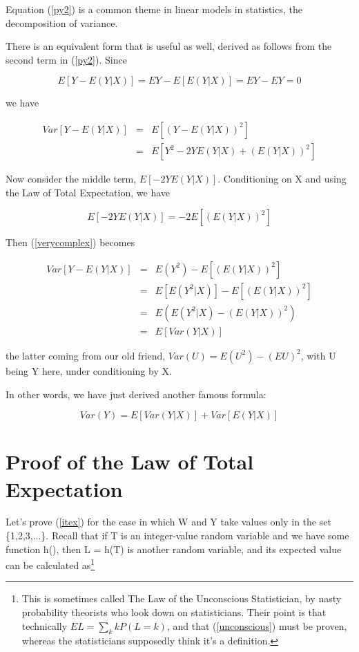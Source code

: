 Equation (\ref{py2}) is a common theme in linear models in statistics,
the decomposition of variance.  

There is an equivalent form that is useful as well, derived as follows
from the second term in (\ref{py2}).  Since

\begin{equation}
E[Y-E(Y|X)] = EY - E[E(Y|X)] = EY - EY = 0
\end{equation}

we have

\begin{eqnarray}
\label{verycomplex}
Var[Y-E(Y|X)] &=& E \left [ (Y-E(Y|X))^2 \right ] \\ 
&=& E \left [ Y^2 -2YE(Y|X) + (E(Y|X))^2 \right ] 
\end{eqnarray}

Now consider the middle term, $E[-2YE(Y|X)]$.  Conditioning on X and
using the Law of Total Expectation, we have

\begin{equation}
E[-2YE(Y|X)] = -2 E \left [ (E(Y|X))^2 \right ]
\end{equation}

Then (\ref{verycomplex}) becomes

\begin{eqnarray}
Var[Y-E(Y|X)] &=& E (Y^2) - E \left [ (E(Y|X))^2 \right ] \\
&=& E \left [ E(Y^2 | X) \right ] - E \left [ (E(Y|X))^2 \right ] \\
&=& E \left ( E(Y^2 | X) - (E(Y|X))^2 \right ) \\
&=& E \left [ Var(Y|X) \right ]
\end{eqnarray}

the latter coming from our old friend, $Var(U) = E(U^2) - (EU)^2$, with
U being Y here, under conditioning by X.

In other words, we have just derived another famous formula:

\begin{equation}
Var(Y) = E[Var(Y|X)] + Var[E(Y|X)]
\end{equation}

\section{Proof of the Law of Total Expectation}
\label{proveitex} 

Let's prove (\ref{itex}) for the case in which W and Y take values only
in the set \{1,2,3,...\}.  Recall that if T is an integer-value random
variable and we have some function h(), then L = h(T) is another random
variable, and its expected value can be calculated as\footnote{This is
sometimes called The Law of the Unconscious Statistician, by nasty
probability theorists who look down on statisticians.  Their point is
that technically $EL = \sum_k k P(L = k)$, and that (\ref{unconscious})
must be proven, whereas the statisticians supposedly think it's a
definition.}  

